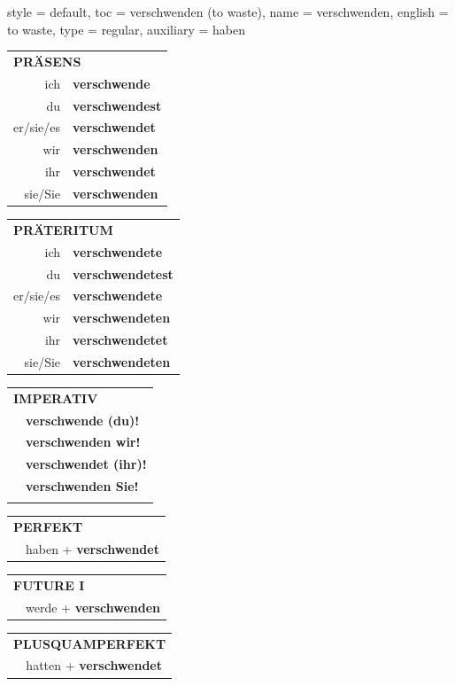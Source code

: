 \begin{verbentry}{
  style = {default},
  toc = {verschwenden (to waste)},
  name = {verschwenden},
  english = {to waste},
  type = {regular},
  auxiliary = {haben}
}
  \begin{tabular}{rl}
     \multicolumn{2}{l}{\textbf{PRÄSENS} }\\
    ich & \textbf{verschwende}\\
    du & \textbf{verschwendest}\\
    er/sie/es & \textbf{verschwendet}\\
    wir & \textbf{verschwenden}\\
    ihr & \textbf{verschwendet}\\
    sie/Sie & \textbf{verschwenden}\\
  \end{tabular}
  \hfill
     \begin{tabular}{rl}
    \multicolumn{2}{l}{\textbf{PRÄTERITUM} }\\
    ich & \textbf{verschwendete}\\
    du & \textbf{verschwendetest}\\
    er/sie/es & \textbf{verschwendete}\\
    wir & \textbf{verschwendeten}\\
    ihr & \textbf{verschwendetet}\\
    sie/Sie & \textbf{verschwendeten}\\
  \end{tabular}
  \hfill
  \begin{tabular}{rl}
     \multicolumn{2}{l}{\textbf{IMPERATIV} }\\
   & \textbf{verschwende (du)!}\\
   & \textbf{verschwenden wir!}\\
   & \textbf{verschwendet (ihr)!}\\
   & \textbf{verschwenden Sie!}\\
   & \vspace{10pt}
  \end{tabular}

    \vspace{10pt}

 \begin{tabular}{rl}
     \multicolumn{2}{l}{\textbf{PERFEKT}}\\
   & haben + \textbf{verschwendet}\\
  \end{tabular}
\hfill
   \begin{tabular}{rl}
    \multicolumn{2}{l}{\textbf{FUTURE I} }\\
   & werde + \textbf{verschwenden}\\
  \end{tabular}
\hfill
   \begin{tabular}{rl}
      \multicolumn{2}{l}{\textbf{PLUSQUAMPERFEKT}}\\
   & hatten + \textbf{verschwendet}\\
  \end{tabular}


\end{verbentry}
